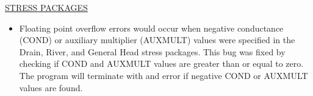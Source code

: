
	\underline{STRESS PACKAGES}
	\begin{itemize}
		\item Floating point overflow errors would occur when negative conductance (COND) or auxiliary multiplier (AUXMULT) values were specified in the Drain, River, and General Head stress packages. This bug was fixed by checking if COND and AUXMULT values are greater than or equal to zero. The program will terminate with and error if negative COND or AUXMULT values are found.
	\end{itemize}


